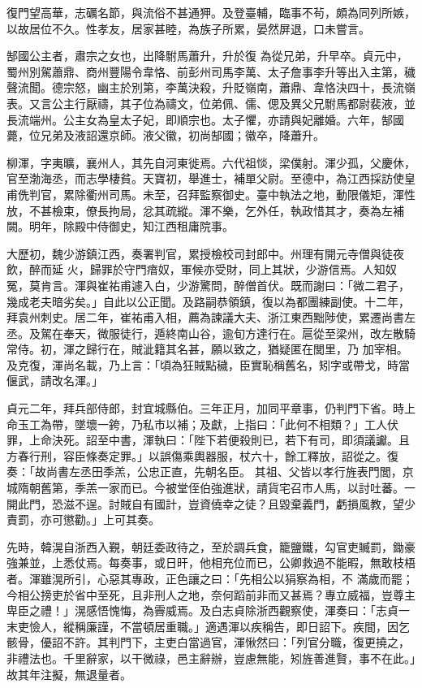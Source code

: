 \begin{pinyinscope}
 復門望高華，志礪名節，與流俗不甚通狎。及登臺輔，臨事不茍，頗為同列所嫉，以故居位不久。性孝友，居家甚睦，為族子所累，晏然屏退，口未嘗言。



 郜國公主者，肅宗之女也，出降駙馬蕭升，升於復
 為從兄弟，升早卒。貞元中，蜀州別駕蕭鼎、商州豐陽令韋恪、前彭州司馬李萬、太子詹事李升等出入主第，穢聲流聞。德宗怒，幽主於別第，李萬決殺，升貶嶺南，蕭鼎、韋恪決四十，長流嶺表。又言公主行厭禱，其子位為禱文，位弟佩、儒、偲及異父兄駙馬都尉裴液，並長流端州。公主女為皇太子妃，即順宗也。太子懼，亦請與妃離婚。六年，郜國薨，位兄弟及液詔還京師。液父徽，初尚郜國；徽卒，降蕭升。



 柳渾，字夷曠，襄州人，其先自河東徙焉。六代祖惔，梁僕射。渾少孤，父慶休，官至渤海丞，而志學棲貧。天寶初，舉進士，補單父尉。至德中，為江西採訪使皇甫侁判官，累除衢州司馬。未至，召拜監察御史。臺中執法之地，動限儀矩，渾性放，不甚檢束，僚長拘局，忿其疏縱。渾不樂，乞外任，執政惜其才，奏為左補闕。明年，除殿中侍御史，知江西租庸院事。



 大歷初，魏少游鎮江西，奏署判官，累授檢校司封郎中。州理有開元寺僧與徒夜飲，醉而延
 火，歸罪於守門瘖奴，軍候亦受財，同上其狀，少游信焉。人知奴冤，莫肯言。渾與崔祐甫遽入白，少游驚問，醉僧首伏。既而謝曰：「微二君子，幾成老夫暗劣矣。」自此以公正聞。及路嗣恭領鎮，復以為都團練副使。十二年，拜袁州刺史。居二年，崔祐甫入相，薦為諫議大夫、浙江東西黜陟使，累遷尚書左丞。及駕在奉天，微服徒行，遁終南山谷，逾旬方達行在。扈從至梁州，改左散騎常侍。初，渾之歸行在，賊泚籍其名甚，願以致之，猶疑匿在閭里，乃
 加宰相。及克復，渾尚名載，乃上言：「頃為狂賊點穢，臣實恥稱舊名，矧字或帶戈，時當偃武，請改名渾。」



 貞元二年，拜兵部侍郎，封宜城縣伯。三年正月，加同平章事，仍判門下省。時上命玉工為帶，墜壞一銙，乃私市以補；及獻，上指曰：「此何不相類？」工人伏罪，上命決死。詔至中書，渾執曰：「陛下若便殺則已，若下有司，即須議讞。且方春行刑，容臣條奏定罪。」以誤傷乘輿器服，杖六十，餘工釋放，詔從之。復奏：「故尚書左丞田季羔，公忠正直，先朝名臣。
 其祖、父皆以孝行旌表門閭，京城隋朝舊第，季羔一家而已。今被堂侄伯強進狀，請貨宅召市人馬，以討吐蕃。一開此門，恐滋不逞。討賊自有國計，豈資僥幸之徒？且毀棄義門，虧損風教，望少責罰，亦可懲勸。」上可其奏。



 先時，韓滉自浙西入覲，朝廷委政待之，至於調兵食，籠鹽鐵，勾官吏贓罰，鋤豪強兼並，上悉仗焉。每奏事，或日旰，他相充位而已，公卿救過不能暇，無敢枝梧者。渾雖滉所引，心惡其專政，正色讓之曰：「先相公以狷察為相，不
 滿歲而罷；今相公搒吏於省中至死，且非刑人之地，奈何蹈前非而又甚焉？專立威福，豈尊主卑臣之禮！」滉感悟愧悔，為霽威焉。及白志貞除浙西觀察使，渾奏曰：「志貞一末吏憸人，縱稱廉謹，不當頓居重職。」適遇渾以疾稱告，即日詔下。疾間，因乞骸骨，優詔不許。其判門下，主吏白當過官，渾愀然曰：「列官分職，復更撓之，非禮法也。千里辭家，以干微祿，邑主辭辦，豈慮無能，矧旌善進賢，事不在此。」故其年注擬，無退量者。




\end{pinyinscope}
